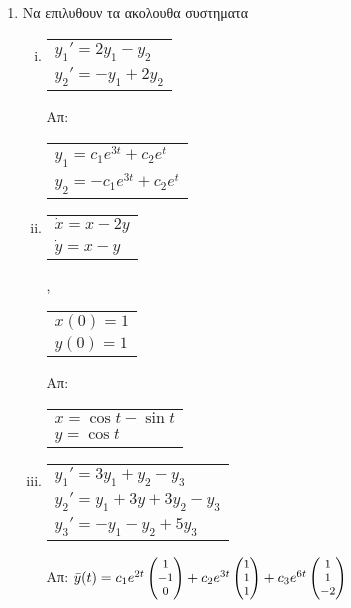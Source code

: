 





\begin{center}
\end{center}

\vspace{\baselineskip}

\begin{enumerate}

\item Να επιλυθουν τα ακολουθα συστηματα

\begin{enumerate}[i)]
\item \begin{tabular}{l} $y_1'=2y_1-y_2$ \\ $y_2'=-y_1+2y_2$\end{tabular} \hfill Απ: \begin{tabular}{l} $y_1=c_1e^{3t}+c_2e^t$ \\ $y_2=-c_1e^{3t}+c_2e^t$\end{tabular}


\item \begin{tabular}{l} $\dot x=x-2y$ \\ $\dot y=x-y$\end{tabular}, \begin{tabular}{l} $x(0)=1$ \\ $y(0)=1$\end{tabular}\hfill Απ:  \begin{tabular}{l} $x=\cos t-\sin t$ \\ $y=\cos t$\end{tabular}

\item  \begin{tabular}{l} $y_1'=3y_1+y_2-y_3$ \\ $y_2'=y_1+3y+3y_2-y_3$ \\ $y_3'=-y_1-y_2+5y_3$\end{tabular}\hfill Απ: $\footnotesize{\bar{y}(t)=c_1e^{2t}\begin{pmatrix}
1\\-1\\0
\end{pmatrix}+c_2e^{3t}\begin{pmatrix}
1\\1\\1
\end{pmatrix}+c_3e^{6t}\begin{pmatrix}
1\\1\\-2
\end{pmatrix}}$


\end{enumerate}
\end{enumerate}
